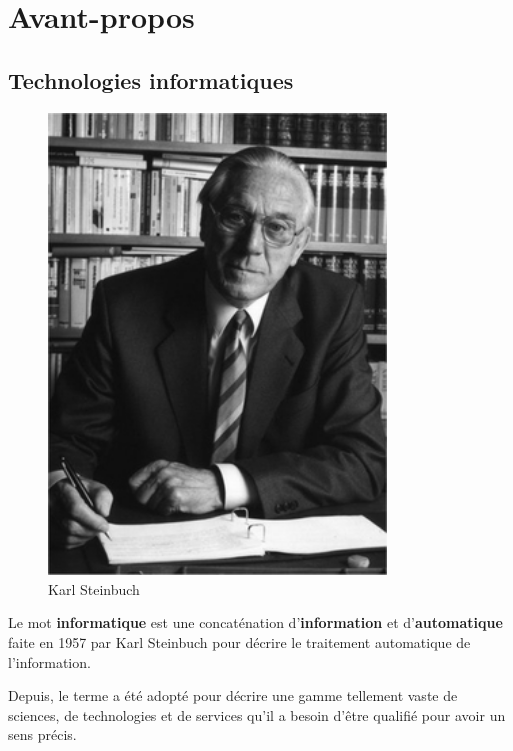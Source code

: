 \chapter*{Avant-propos}

\section*{\og Technologies informatiques \fg{}}

\begin{minipage}[H]{0.3\linewidth}
  \begin{figure}[H]
  \centering
  \includegraphics[width=0.8\textwidth]{../resources/illustrations/steinbuch}
  \caption{Karl Steinbuch}
  \end{figure}
\end{minipage}
\begin{minipage}[H]{0.7\linewidth}
Le mot \textbf{informatique} est une concaténation d'\textbf{information} et d'\textbf{automatique} faite en 1957 par Karl Steinbuch\cite{steinbuch-2005} pour décrire le traitement automatique de l'information.

Depuis, le terme a été adopté pour décrire une gamme tellement vaste de sciences, de technologies et de services qu'il a besoin d'être qualifié pour avoir un sens précis.
\vspace{1cm}
\end{minipage}

